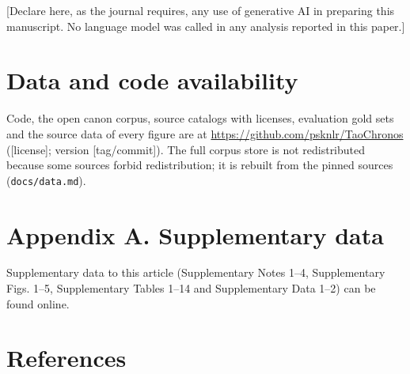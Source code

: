 \documentclass[
]{article}
\begin{document}
{[}Declare here, as the journal requires, any use of generative AI in
preparing this manuscript. No language model was called in any analysis
reported in this paper.{]}

\hypertarget{data-and-code-availability}{%
\section*{Data and code availability}\label{data-and-code-availability}}

Code, the open canon corpus, source catalogs with licenses, evaluation
gold sets and the source data of every figure are at
\url{https://github.com/psknlr/TaoChronos} ({[}license{]}; version
{[}tag/commit{]}). The full corpus store is not redistributed because
some sources forbid redistribution; it is rebuilt from the pinned
sources (\texttt{docs/data.md}).

\hypertarget{appendix-a.-supplementary-data}{%
\section*{Appendix A. Supplementary
data}\label{appendix-a.-supplementary-data}}

Supplementary data to this article (Supplementary Notes 1--4,
Supplementary Figs. 1--5, Supplementary Tables 1--14 and Supplementary
Data 1--2) can be found online.

\hypertarget{references}{%
\section*{References}\label{references}}
\end{document}
